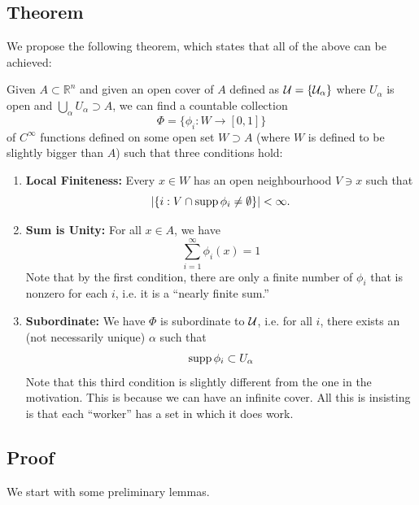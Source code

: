 \documentclass{article}
\numberwithin{equation}{section}
\begin{document}
\subsection{Theorem}
We propose the following theorem, which states that all of the above can be achieved:
\begin{theorem}
    Given $A\subset \mathbb{R}^n$ and given an open cover of $A$ defined as $\cal{U} = \{U_\alpha\}$ where $U_\alpha$ is open and $\bigcup_\alpha U_\alpha \supset A$, we can find a countable collection 
    \begin{equation}
        \Phi = \{\phi_i: W\rightarrow [0,1]\}
    \end{equation}
    of $C^\infty$ functions defined on some open set $W \supset A$ (where $W$ is defined to be slightly bigger than $A$) such that three conditions hold:
    \begin{enumerate}
        \item \textbf{Local Finiteness:} Every $x\in W$ has an open neighbourhood $V\ni x$ such that 
        \begin{equation}
            \left|\{i: V\cap \operatorname{supp} \phi_i \neq \emptyset\} \right| < \infty.
        \end{equation}
        \item \textbf{Sum is Unity:} For all $x\in A$, we have
        \begin{equation}
            \sum_{i=1}^\infty \phi_i(x) = 1
        \end{equation}
        Note that by the first condition, there are only a finite number of $\phi_i$ that is nonzero for each $i$, i.e. it is a ``nearly finite sum.''
        \item \textbf{Subordinate:} We have $\Phi$ is subordinate to $\cal{U}$, i.e. for all $i$, there exists an (not necessarily unique) $\alpha$ such that
        \begin{equation}
            \operatorname{supp} \phi_i \subset U_\alpha
        \end{equation}
        Note that this third condition is slightly different from the one in the motivation. This is because we can have an infinite cover. All this is insisting is that each ``worker'' has a set in which it does work.
    \end{enumerate}
\end{theorem}
\subsection{Proof}
We start with some preliminary lemmas.
\end{document}
